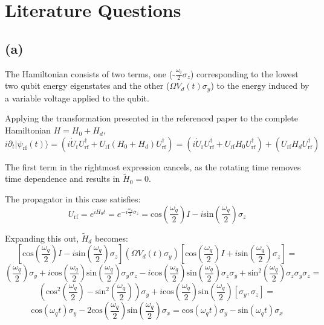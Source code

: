\documentclass{article}
\begin{document}
\section{Literature Questions}

\subsection{(a)}

The Hamiltonian consists of two terms, one (-$\frac{\omega_q}{2}\sigma_z$) corresponding to the lowest two qubit energy eigenstates and the other ($\Omega V_d(t)\sigma_y$) to the energy induced by a variable voltage applied to the qubit.

Applying the transformation presented in the referenced paper to the complete Hamiltonian $H=H_0+H_d$, $$i\partial_t|\psi_\text{rf}(t)\rangle=
\left(i\dot{U}_\text{r}U_\text{rf}^\dagger+U_\text{rf}(H_0+H_d)U_\text{rf}^\dagger\right)=
\left(i\dot{U}_\text{r}U_\text{rf}^\dagger+U_\text{rf}H_0U_\text{rf}^\dagger\right)+
\left(U_\text{rf}H_dU_\text{rf}^\dagger\right)$$

The first term in the rightmost expression cancels, as the rotating time removes time dependence and results in $\tilde{H}_0=0$.

The propagator in this case satisfies:\newline $$U_\text{rf}=e^{iH_0t}=e^{-i\frac{\omega_q}{2}\sigma_z}=
\text{cos}\left(\frac{\omega_q}{2}\right)I-i\text{sin}\left(\frac{\omega_q}{2}\right)\sigma_z$$

Expanding this out, $\tilde{H}_d$ becomes:
$$
[\text{cos}\left(\frac{\omega_q}{2}\right)I-i\text{sin}\left(\frac{\omega_q}{2}\right)\sigma_z]
(\Omega V_d(t)\sigma_y)
[\text{cos}\left(\frac{\omega_q}{2}\right)I+i\text{sin}\left(\frac{\omega_q}{2}\right)\sigma_z]=
$$
$$
\left(\frac{\omega_q}{2}\right)\sigma_y+
i\text{cos}\left(\frac{\omega_q}{2}\right)\text{sin}\left(\frac{\omega_q}{2}\right)\sigma_y\sigma_z-
i\text{cos}\left(\frac{\omega_q}{2}\right)\text{sin}\left(\frac{\omega_q}{2}\right)\sigma_z\sigma_y+\text{sin}^2\left(\frac{\omega_q}{2}\right)\sigma_z\sigma_y\sigma_z=
$$
$$
\left(\text{cos}^2\left(\frac{\omega_q}{2}\right)-\text{sin}^2\left(\frac{\omega_q}{2}\right)\right)\sigma_y+
i\text{cos}\left(\frac{\omega_q}{2}\right)\text{sin}\left(\frac{\omega_q}{2}\right)[\sigma_y, \sigma_z]=
$$
$$
\text{cos}(\omega_qt)\sigma_y-2\text{cos}\left(\frac{\omega_q}{2}\right)\text{sin}\left(\frac{\omega_q}{2}\right)\sigma_x=
\text{cos}(\omega_qt)\sigma_y-\text{sin}(\omega_qt)\sigma_x
$$
\end{document}
